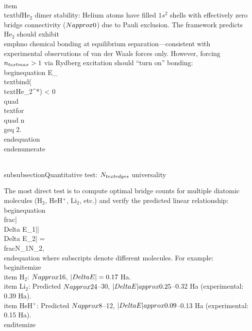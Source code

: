 \documentclass[aps,prd,twocolumn,superscriptaddress,groupedaddress,showpacs]{revtex4-2}
\begin{document}
\\item \\textbf{He$_2$ dimer stability}: Helium atoms have filled $1s^2$ shells with effectively zero bridge connectivity ($N \\approx 0$) due to Pauli exclusion. The framework predicts He$_2$ should exhibit \\emph{no} chemical bonding at equilibrium separation---consistent with experimental observations of van der Waals forces only. However, forcing $n_{\\text{max}} > 1$ via Rydberg excitation should ``turn on'' bonding:
\\begin{equation}
E_{\\text{bind}}(\\text{He}_2^*) < 0 \\quad \\text{for} \\quad n \\geq 2.
\\end{equation}
\\end{enumerate}

\\subsubsection{Quantitative test: $N_{\\text{edges}}$ universality}

The most direct test is to compute optimal bridge counts for multiple diatomic molecules (H$_2$, HeH$^+$, Li$_2$, etc.) and verify the predicted linear relationship:
\\begin{equation}
\\frac{|\\Delta E_1|}{|\\Delta E_2|} = \\frac{N_1}{N_2},
\\end{equation}
where subscripts denote different molecules. For example:
\\begin{itemize}
\\item H$_2$: $N \\approx 16$, $|\\Delta E| = 0.17$ Ha.
\\item Li$_2$: Predicted $N \\approx 24$--30, $|\\Delta E| \\approx 0.25$--0.32 Ha (experimental: 0.39 Ha).
\\item HeH$^+$: Predicted $N \\approx 8$--12, $|\\Delta E| \\approx 0.09$--0.13 Ha (experimental: 0.15 Ha).
\\end{itemize}
\end{document}
